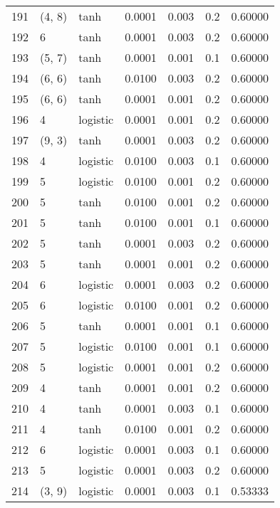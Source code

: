 \begin{tabular}{lllrrrr}
191 &      (4, 8) &      tanh &  0.0001 &  0.003 &  0.2 &   0.60000 \\
192 &           6 &      tanh &  0.0001 &  0.003 &  0.2 &   0.60000 \\
193 &      (5, 7) &      tanh &  0.0001 &  0.001 &  0.1 &   0.60000 \\
194 &      (6, 6) &      tanh &  0.0100 &  0.003 &  0.2 &   0.60000 \\
195 &      (6, 6) &      tanh &  0.0001 &  0.001 &  0.2 &   0.60000 \\
196 &           4 &  logistic &  0.0001 &  0.001 &  0.2 &   0.60000 \\
197 &      (9, 3) &      tanh &  0.0001 &  0.003 &  0.2 &   0.60000 \\
198 &           4 &  logistic &  0.0100 &  0.003 &  0.1 &   0.60000 \\
199 &           5 &  logistic &  0.0100 &  0.001 &  0.2 &   0.60000 \\
200 &           5 &      tanh &  0.0100 &  0.001 &  0.2 &   0.60000 \\
201 &           5 &      tanh &  0.0100 &  0.001 &  0.1 &   0.60000 \\
202 &           5 &      tanh &  0.0001 &  0.003 &  0.2 &   0.60000 \\
203 &           5 &      tanh &  0.0001 &  0.001 &  0.2 &   0.60000 \\
204 &           6 &  logistic &  0.0001 &  0.003 &  0.2 &   0.60000 \\
205 &           6 &  logistic &  0.0100 &  0.001 &  0.2 &   0.60000 \\
206 &           5 &      tanh &  0.0001 &  0.001 &  0.1 &   0.60000 \\
207 &           5 &  logistic &  0.0100 &  0.001 &  0.1 &   0.60000 \\
208 &           5 &  logistic &  0.0001 &  0.001 &  0.2 &   0.60000 \\
209 &           4 &      tanh &  0.0001 &  0.001 &  0.2 &   0.60000 \\
210 &           4 &      tanh &  0.0001 &  0.003 &  0.1 &   0.60000 \\
211 &           4 &      tanh &  0.0100 &  0.001 &  0.2 &   0.60000 \\
212 &           6 &  logistic &  0.0001 &  0.003 &  0.1 &   0.60000 \\
213 &           5 &  logistic &  0.0001 &  0.003 &  0.2 &   0.60000 \\
214 &      (3, 9) &  logistic &  0.0001 &  0.003 &  0.1 &   0.53333 \\

\end{tabular}

